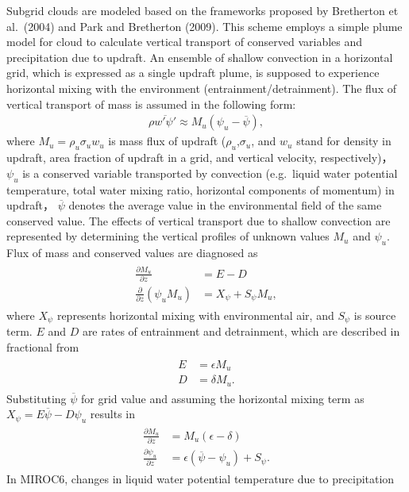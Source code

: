 Subgrid clouds are modeled based on the frameworks proposed by Bretherton et al.~(2004) and Park and Bretherton (2009). This scheme employs a simple plume model for cloud to calculate vertical
transport of conserved variables and precipitation due to updraft. An ensemble of shallow convection in a horizontal grid, which is expressed as a single updraft plume, is supposed to experience
horizontal mixing with the environment (entrainment/detrainment). The flux of vertical transport of mass is assumed in the following form: \begin{eqnarray}\label{def_Mu}
    \rho \overline {w' \psi '}\approx M_u (\psi_u-\overline{\psi}) ,\end{eqnarray} where \(M_u=\rho_u\sigma_u w_u\) is mass flux of updraft (\(\rho_u\),\(\sigma_u\), and \(w_u\) stand for density in updraft, area
fraction of updraft in a grid, and vertical velocity, respectively)， \(\psi_u\) is a conserved variable transported by convection (e.g.~liquid water potential temperature, total water mixing ratio,
horizontal components of momentum) in updraft， \(\overline{\psi}\) denotes the average value in the environmental field of the same conserved value. The effects of vertical transport due to shallow
convection are represented by determining the vertical profiles of unknown values \(M_u\) and \(\psi_u\). Flux of mass and conserved values are diagnosed as \begin{eqnarray}\begin{aligned}
    \frac{\partial M_u}{\partial z} &= E - D \label{zprof_Mu}\\
    \frac{\partial}{\partial z} (\psi_u M_u) &= X_\psi + S_\psi M_u,\label{zprof_psi}\end{aligned}\end{eqnarray} where \(X_\psi\) represents horizontal mixing with environmental air, and \(S_\psi\) is source
term. \(E\) and \(D\) are rates of entrainment and detrainment, which are described in fractional from \begin{eqnarray}\begin{aligned}
    E &=\epsilon M_u \label{fracE}\\
    D &=\delta M_u. \label{fracD}\end{aligned}\end{eqnarray} Substituting \(\overline{\psi}\) for grid value and assuming the horizontal mixing term as \(X_{\psi}=E \overline{\psi} - D\psi_u\) results in
\begin{eqnarray}\begin{aligned}
    \frac{\partial M_u}{\partial z} &= M_u (\epsilon - \delta) \label{zprof_Mu'}\\
    \frac{\partial \psi_u}{\partial z} &= \epsilon(\overline{\psi} - \psi_u) + S_{\psi}. \label{zprof_psi'}\end{aligned}\end{eqnarray} In MIROC6, changes in liquid water potential temperature due to precipitation
